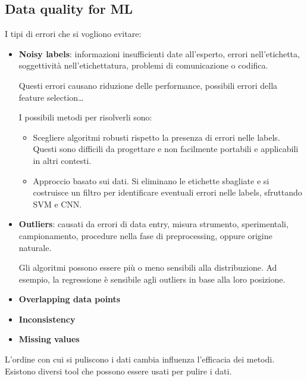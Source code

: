 \subsection{Data quality for ML}
I tipi di errori che si vogliono evitare:
\begin{itemize}
      \item \textbf{Noisy labels}: informazioni insufficienti date all'esperto,
            errori nell'etichetta, soggettività nell'etichettatura, problemi di
            comunicazione o codifica.

            Questi errori causano riduzione delle performance, possibili errori
            della feature selection\dots

            I possibili metodi per risolverli sono:
            \begin{itemize}
                  \item Scegliere algoritmi robusti rispetto la presenza di errori
                        nelle labels. Questi sono difficili da progettare e non
                        facilmente portabili e applicabili in altri contesti.
                  \item Approccio basato sui dati. Si eliminano le etichette sbagliate
                        e si costruisce un filtro per identificare eventuali errori
                        nelle labels, sfruttando SVM e CNN.
            \end{itemize}
      \item \textbf{Outliers}: causati da errori di data entry, misura strumento,
            sperimentali, campionamento, procedure nella fase di preprocessing, 
            oppure origine naturale.

            Gli algoritmi possono essere più o meno sensibili alla distribuzione. 
            Ad esempio, la regressione è sensibile agli outliers in base alla 
            loro posizione.
      \item \textbf{Overlapping data points}
      \item \textbf{Inconsistency}
      \item \textbf{Missing values}
\end{itemize}

L'ordine con cui si puliscono i dati cambia influenza l'efficacia dei metodi. 
Esistono diversi tool che possono essere usati per pulire i dati.